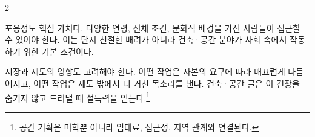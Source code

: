 \documentclass[9.5pt]{memoir}
\begin{document}
\begin{multicols*}{2}
{\bodyf\noindent 포용성도 핵심 가치다. 다양한 연령, 신체 조건, 문화적 배경을 가진 사람들이 접근할 수 있어야 한다. 이는 단지 친절한 배려가 아니라 건축·공간 분야가 사회 속에서 작동하기 위한 기본 조건이다.\par}


{\bodyf\noindent 시장과 제도의 영향도 고려해야 한다. 어떤 작업은 자본의 요구에 따라 매끄럽게 다듬어지고, 어떤 작업은 제도 밖에서 더 거친 목소리를 낸다. 건축·공간 글은 이 긴장을 숨기지 않고 드러낼 때 설득력을 얻는다.\footnote{공간 기획은 미학뿐 아니라 임대료, 접근성, 지역 관계와 연결된다.}\par}

\end{multicols*}
\end{document}
